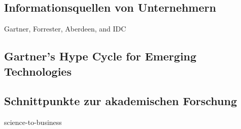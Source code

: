 %
%
%
%

\subsection{Informationsquellen von Unternehmern}
Gartner, Forrester, Aberdeen, and IDC

\subsection{Gartner’s Hype Cycle for Emerging Technologies}

\subsection{Schnittpunkte zur akademischen Forschung}
science-to-business